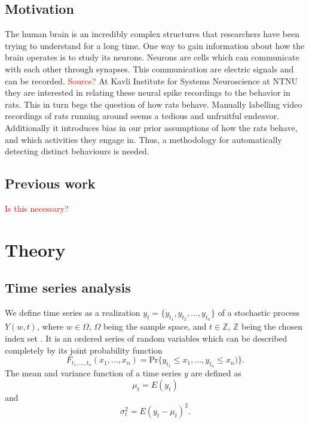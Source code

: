 \documentclass[a4paper]{memoir}
\theoremstyle{plain}
\theoremstyle{definition}
\theoremstyle{remark}
\begin{document}
\section{Motivation}
The human brain is an incredibly complex structures that researchers have been trying to understand for a long time.
One way to gain information about how the brain operates is to study its neurons.
Neurons are cells which can communicate with each other through synapses.
This communication are electric signals and can be recorded.
\textcolor{red}{Source?}
At Kavli Institute for Systems Neuroscience at NTNU they are interested in relating these neural spike recordings to the behavior in rats.
This in turn begs the question of how rats behave.
Manually labelling video recordings of rats running around seems a tedious and unfruitful endeavor.
Additionally it introduces bias in our prior assumptions of how the rats behave, and which activities they engage in.
Thus, a methodology for automatically detecting distinct behaviours is needed.

\section{Previous work}
\textcolor{red}{Is this necessary?}



\chapter{Theory}
\section{Time series analysis}
We define time series as a realization $y_t = \{ y_{t_1}, y_{t_2}, \hdots, y_{t_n} \}$ of a stochastic process $Y(w, t)$, where $w \in \Omega$, $\Omega$ being the sample space,  and $t \in \mathbb{Z}$, $\mathbb{Z}$ being the chosen index set  \cite{wei}.
It is an ordered series of random variables which can be described completely by its joint probability function
\begin{equation*}
        F_{t_1,\hdots, t_n}(x_1, \hdots, x_n) = \text{Pr}\{ y_{t_1} \leq x_{1}, \hdots, y_{t_n} \leq x_n) \}.
\end{equation*}
The mean and variance function of a time series $y$ are defined as
\begin{equation}\label{eq:mean_func}
        \mu_t = E(y_t)  
\end{equation}
and
\begin{equation*}
        \sigma_t^2 = E(y_t - \mu_t)^2.
\end{equation*}
\end{document}
